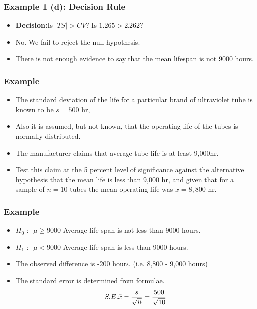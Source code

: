 \begin{frame}
\frametitle{Example 1 (d): Decision Rule }
\large
\begin{itemize}
\item \textbf{Decision:}Is $|TS| >CV$? Is $1.265 > 2.262$?
\item No. We fail to reject the null hypothesis. \item There is not enough evidence to say that the mean lifespan is not 9000 hours.
\end{itemize}
\end{frame}
\begin{frame}
\frametitle{Example}
\large
\begin{itemize}
\item The standard deviation of the life for a particular brand of ultraviolet tube is known to be $s = 500$ hr,
\item Also it is assumed, but not known, that the operating life of the tubes is normally distributed. \item The manufacturer claims that average tube life
is at least 9,000hr. \item Test this claim at the 5 percent level of significance against the alternative hypothesis
that the mean life is less than 9,000 hr, and given that for a sample of $n = 10$ tubes the mean operating
life was $\bar{x}  =  8,800$ hr.
\end{itemize}
\end{frame}

\begin{frame}
\frametitle{Example}
\large
\begin{itemize}
\item $H_0 \mbox{ : } $ $\mu \geq 9000$	Average life span is not less than 9000 hours.
\item $H_1 \mbox{ : } $ $\mu < 9000$    Average life span is  less than 9000 hours.
\end{itemize}
\bigskip
\begin{itemize}
\item The observed difference is -200 hours. (i.e. 8,800 - 9,000 hours)
\item The standard error is determined from formulae.
\[ S.E. \bar{x}  = {s \over \sqrt{n}} = {500 \over \sqrt{10}} \]
\end{itemize}
\end{frame}

